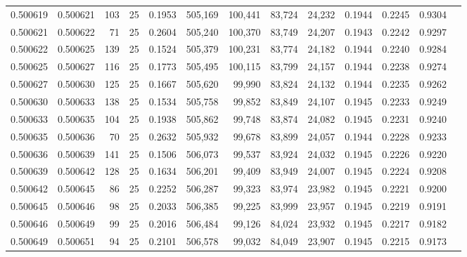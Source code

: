 \begin{tabular}{rrrrrrrrrrrrr}
0.500619 & 0.500621 & 103 &  25 &                                     0.1953 & 505,169 & 100,441 &  83,724 &  24,232 & 0.1944 & 0.2245 & 0.9304 \\
0.500621 & 0.500622 &  71 &  25 &                                     0.2604 & 505,240 & 100,370 &  83,749 &  24,207 & 0.1943 & 0.2242 & 0.9297 \\
0.500622 & 0.500625 & 139 &  25 &                                     0.1524 & 505,379 & 100,231 &  83,774 &  24,182 & 0.1944 & 0.2240 & 0.9284 \\
0.500625 & 0.500627 & 116 &  25 &                                     0.1773 & 505,495 & 100,115 &  83,799 &  24,157 & 0.1944 & 0.2238 & 0.9274 \\
0.500627 & 0.500630 & 125 &  25 &                                     0.1667 & 505,620 &  99,990 &  83,824 &  24,132 & 0.1944 & 0.2235 & 0.9262 \\
0.500630 & 0.500633 & 138 &  25 &                                     0.1534 & 505,758 &  99,852 &  83,849 &  24,107 & 0.1945 & 0.2233 & 0.9249 \\
0.500633 & 0.500635 & 104 &  25 &                                     0.1938 & 505,862 &  99,748 &  83,874 &  24,082 & 0.1945 & 0.2231 & 0.9240 \\
0.500635 & 0.500636 &  70 &  25 &                                     0.2632 & 505,932 &  99,678 &  83,899 &  24,057 & 0.1944 & 0.2228 & 0.9233 \\
0.500636 & 0.500639 & 141 &  25 &                                     0.1506 & 506,073 &  99,537 &  83,924 &  24,032 & 0.1945 & 0.2226 & 0.9220 \\
0.500639 & 0.500642 & 128 &  25 &                                     0.1634 & 506,201 &  99,409 &  83,949 &  24,007 & 0.1945 & 0.2224 & 0.9208 \\
0.500642 & 0.500645 &  86 &  25 &                                     0.2252 & 506,287 &  99,323 &  83,974 &  23,982 & 0.1945 & 0.2221 & 0.9200 \\
0.500645 & 0.500646 &  98 &  25 &                                     0.2033 & 506,385 &  99,225 &  83,999 &  23,957 & 0.1945 & 0.2219 & 0.9191 \\
0.500646 & 0.500649 &  99 &  25 &                                     0.2016 & 506,484 &  99,126 &  84,024 &  23,932 & 0.1945 & 0.2217 & 0.9182 \\
0.500649 & 0.500651 &  94 &  25 &                                     0.2101 & 506,578 &  99,032 &  84,049 &  23,907 & 0.1945 & 0.2215 & 0.9173 \\

\end{tabular}
